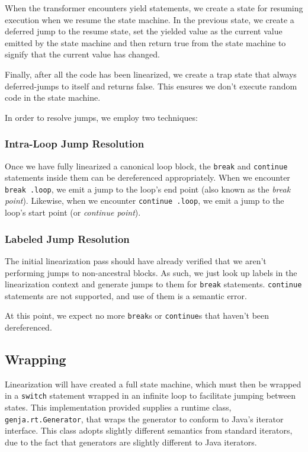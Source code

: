 \documentclass[journal,a4paper]{IEEEtran}
\begin{document}
When the transformer encounters yield statements, we create a state for resuming execution when we
resume the state machine. In the previous state, we create a deferred jump to the resume state, set
the yielded value as the current value emitted by the state machine and then return true from the
state machine to signify that the current value has changed.

Finally, after all the code has been linearized, we create a trap state that always deferred-jumps
to itself and returns false. This ensures we don't execute random code in the state machine.

In order to resolve jumps, we employ two techniques:

\subsubsection{Intra-Loop Jump Resolution} \label{section:intra-loop-jump-resolution}

Once we have fully linearized a canonical loop block, the \texttt{break} and \texttt{continue}
statements inside them can be dereferenced appropriately. When we encounter \texttt{break .loop},
we emit a jump to the loop's end point (also known as the \emph{break point}). Likewise, when we
encounter \texttt{continue .loop}, we emit a jump to the loop's start point (or \emph{continue
point}).

\subsubsection{Labeled Jump Resolution}

The initial linearization pass should have already verified that we aren't performing jumps to
non-ancestral blocks. As such, we just look up labels in the linearization context and generate
jumps to them for \texttt{break} statements. \texttt{continue} statements are not supported, and
use of them is a semantic error.

At this point, we expect no more \texttt{break}s or \texttt{continue}s that haven't been
dereferenced.

\subsection{Wrapping}

Linearization will have created a full state machine, which must then be wrapped in a
\texttt{switch} statement wrapped in an infinite loop to facilitate jumping between states. This
implementation provided supplies a runtime class, \texttt{genja.rt.Generator}, that wraps the
generator to conform to Java's iterator interface. This class adopts slightly different semantics
from standard iterators, due to the fact that generators are slightly different to Java iterators.
\end{document}
